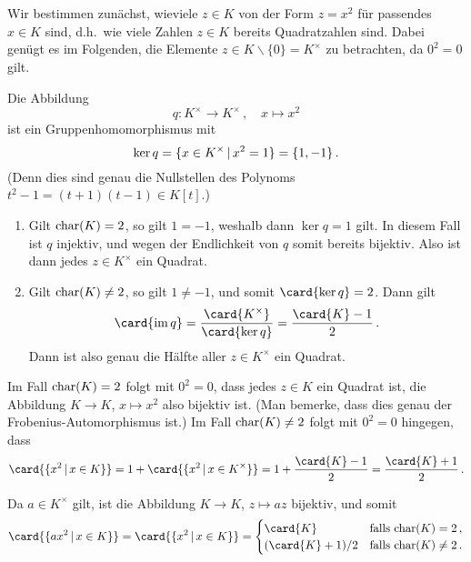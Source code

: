 \section{}





\subsection{}

Wir bestimmen zunächst, wieviele $z \in K$ von der Form $z = x^2$ für passendes $x \in K$ sind, d.h.\ wie viele Zahlen $z \in K$ bereits Quadratzahlen sind.
Dabei genügt es im Folgenden, die Elemente $z \in K \smallsetminus \{0\} = K^\times$ zu betrachten, da $0^2 = 0$ gilt.

Die Abbildung
\[
          q
  \colon  K^\times
  \to     K^\times \,,
  \quad   x
  \mapsto x^2
\]
ist ein Gruppenhomomorphismus mit
\[
    \ker q
  = \{
      x \in K^\times
    \suchthat
      x^2 = 1
    \}
  = \{1, -1\} \,.
\]
(Denn dies sind genau die Nullstellen des Polynoms $t^2 - 1 = (t+1)(t-1) \in K[t]$.)
\begin{enumerate}
  \item
    Gilt $\operatorname{char}(K) = 2$, so gilt $1 = -1$, weshalb dann $\ker q = 1$ gilt.
    In diesem Fall ist $q$ injektiv, und wegen der Endlichkeit von $q$ somit bereits bijektiv.
    Also ist dann jedes $z \in K^\times$ ein Quadrat.
  \item
    Gilt $\operatorname{char}(K) \neq 2$, so gilt $1 \neq -1$, und somit $\card{\ker q} = 2$.
    Dann gilt
    \[
        \card{\im q}
      = \frac{\card{K^\times}}{\card{\ker q}}
      = \frac{\card{K} - 1}{2} \,.
    \]
    Dann ist also genau die Hälfte aller $z \in K^\times$ ein Quadrat.
\end{enumerate}
Im Fall $\operatorname{char}(K) = 2$ folgt mit $0^2 = 0$, dass jedes $z \in K$ ein Quadrat ist, die Abbildung $K \to K$, $x \mapsto x^2$ also bijektiv ist.
(Man bemerke, dass dies genau der Frobenius-Automorphismus ist.)
Im Fall $\operatorname{char}(K) \neq 2$ folgt mit $0^2 = 0$ hingegen, dass
\[
    \card{ \{ x^2 \suchthat x \in K \} }
  = 1 + \card{ \{ x^2 \suchthat x \in K^\times \} }
  = 1 + \frac{\card{K} - 1}{2}
  = \frac{\card{K} + 1}{2} \,.  
\]

Da $a \in K^\times$ gilt, ist die Abbildung $K \to K$, $z \mapsto az$ bijektiv, und somit
\[
    \card{ \{a x^2 \suchthat x \in K\} }
  = \card{ \{x^2 \suchthat x \in K\} }
  = \begin{cases}
      \card{K}        & \text{falls $\ringchar{K} = 2$}     \,, \\
      (\card{K}+1)/2  & \text{falls $\ringchar{K} \neq 2$}  \,.
    \end{cases}
\]





